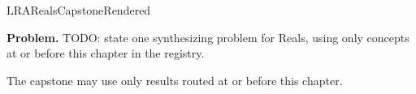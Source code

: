 \ifcsname LRARealsCapstoneRendered\endcsname
\else
\expandafter\gdef\csname LRARealsCapstoneRendered\endcsname{}

\newpage
{}
\label{cap:reals}

\begin{tcolorbox}[
  colback=gray!6,
  colframe=gray!40,
  arc=2pt,
  left=8pt, right=8pt, top=6pt, bottom=6pt,
  title={\small\textbf{Capstone Problem}},
  fonttitle=\small\bfseries
]
\textbf{Problem.}
TODO: state one synthesizing problem for Reals, using only concepts at or
before this chapter in the registry.
\end{tcolorbox}

\begin{remark*}
The capstone may use only results routed at or before this chapter.
\end{remark*}

\clearpage
\fi
